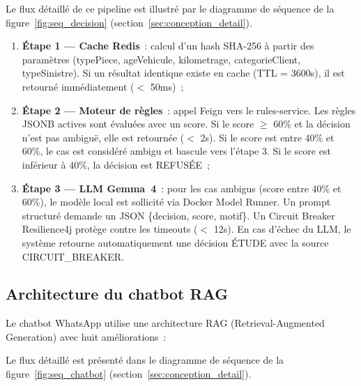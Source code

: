 Le flux d\'{e}taill\'{e} de ce pipeline est illustr\'{e} par le diagramme de s\'{e}quence de la figure~\ref{fig:seq_decision} (section~\ref{sec:conception_detail}).

\begin{enumerate}
    \item \textbf{Étape 1 — Cache Redis}~: calcul d'un hash SHA-256 à partir des paramètres (typePiece, ageVehicule, kilometrage, categorieClient, typeSinistre). Si un résultat identique existe en cache (TTL = 3600s), il est retourné immédiatement ($<$ 50ms)~;
    \item \textbf{\'{E}tape 2 --- Moteur de r\`{e}gles}~: appel Feign vers le rules-service. Les r\`{e}gles JSONB actives sont \'{e}valu\'{e}es avec un score. Si le score $\geq$ 60\% et la d\'{e}cision n'est pas ambigu\"e, elle est retourn\'{e}e ($<$ 2s). Si le score est entre 40\% et 60\%, le cas est consid\'{e}r\'{e} ambigu et bascule vers l'\'{e}tape 3. Si le score est inf\'{e}rieur \`{a} 40\%, la d\'{e}cision est REFUS\'{E}E~;
    \item \textbf{\'{E}tape 3 --- LLM Gemma~4}~: pour les cas ambigus (score entre 40\% et 60\%), le mod\`{e}le local est sollicit\'{e} via Docker Model Runner. Un prompt structur\'{e} demande un JSON \{decision, score, motif\}. Un Circuit Breaker Resilience4j prot\`{e}ge contre les timeouts ($<$ 12s). En cas d'\'{e}chec du LLM, le syst\`{e}me retourne automatiquement une d\'{e}cision \'{E}TUDE avec la source CIRCUIT\_BREAKER.
\end{enumerate}

\subsection{Architecture du chatbot RAG}

Le chatbot WhatsApp utilise une architecture RAG (Retrieval-Augmented Generation) avec huit améliorations~:

Le flux d\'{e}taill\'{e} est pr\'{e}sent\'{e} dans le diagramme de s\'{e}quence de la figure~\ref{fig:seq_chatbot} (section~\ref{sec:conception_detail}).

